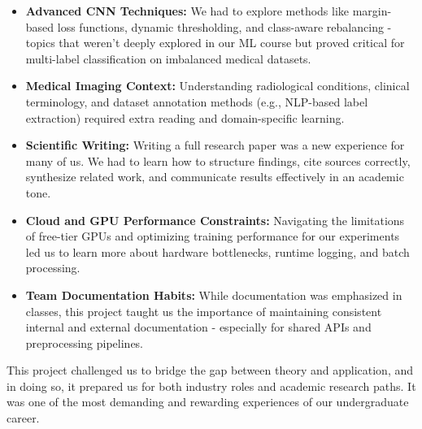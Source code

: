 \documentclass{article}
\begin{document}
\begin{itemize}
    \item \textbf{Advanced CNN Techniques:} We had to explore methods like margin-based loss functions, dynamic thresholding, and class-aware rebalancing - topics that weren't deeply explored in our ML course but proved critical for multi-label classification on imbalanced medical datasets.
    
    \item \textbf{Medical Imaging Context:} Understanding radiological conditions, clinical terminology, and dataset annotation methods (e.g., NLP-based label extraction) required extra reading and domain-specific learning.
    
    \item \textbf{Scientific Writing:} Writing a full research paper was a new experience for many of us. We had to learn how to structure findings, cite sources correctly, synthesize related work, and communicate results effectively in an academic tone.
    
    \item \textbf{Cloud and GPU Performance Constraints:} Navigating the limitations of free-tier GPUs and optimizing training performance for our experiments led us to learn more about hardware bottlenecks, runtime logging, and batch processing.
    
    \item \textbf{Team Documentation Habits:} While documentation was emphasized in classes, this project taught us the importance of maintaining consistent internal and external documentation - especially for shared APIs and preprocessing pipelines.
\end{itemize}

This project challenged us to bridge the gap between theory and application, and in doing so, it prepared us for both industry roles and academic research paths. It was one of the most demanding and rewarding experiences of our undergraduate career.
\end{document}
